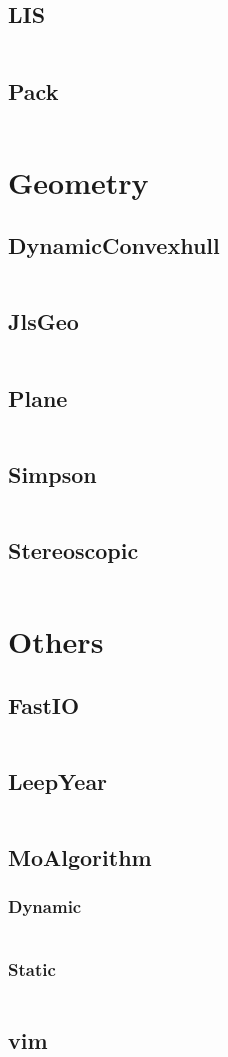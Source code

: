 \documentclass[a4paper,11pt]{article}
\begin{document}
\subsection{LIS}
\inputminted[breaklines]{c++}{05++DynamicProgramming/+LIS.cpp}
\subsection{Pack}
\inputminted[breaklines]{c++}{05++DynamicProgramming/+Pack.cpp}

\newpage
\section{Geometry}
\subsection{DynamicConvexhull}
\inputminted[breaklines]{c++}{06++Geometry/+DynamicConvexhull.cpp}
\subsection{JlsGeo}
\inputminted[breaklines]{c++}{06++Geometry/+JlsGeo.cpp}
\subsection{Plane}
\inputminted[breaklines]{c++}{06++Geometry/+Plane.cpp}
\subsection{Simpson}
\inputminted[breaklines]{c++}{06++Geometry/+Simpson.cpp}
\subsection{Stereoscopic}
\inputminted[breaklines]{c++}{06++Geometry/+Stereoscopic.cpp}

\newpage
\section{Others}
\subsection{FastIO}
\inputminted[breaklines]{c++}{07++Others/+FastIO.cpp}
\subsection{LeepYear}
\inputminted[breaklines]{c++}{07++Others/+LeepYear.cpp}
\subsection{MoAlgorithm}
\subsubsection{Dynamic}
\inputminted[breaklines]{c++}{07++Others/+MoAlgorithm/+Dynamic.cpp}
\subsubsection{Static}
\inputminted[breaklines]{c++}{07++Others/+MoAlgorithm/+Static.cpp}

\subsection{vim}
\inputminted[breaklines]{c++}{07++Others/+vim.vim}

\newpage
\end{document}
